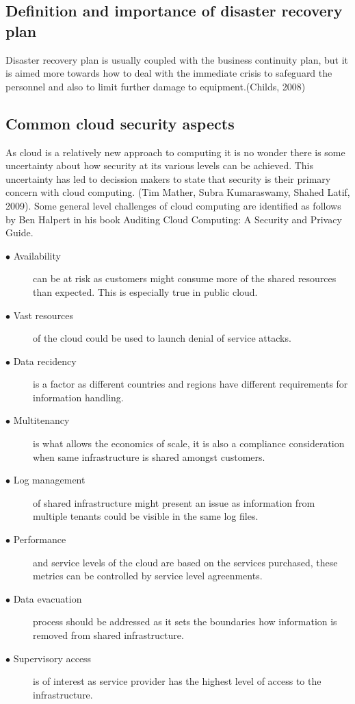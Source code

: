 \documentclass{article}
\begin{document}
\subsection{Definition and importance of disaster recovery plan}
Disaster recovery plan is usually coupled with the business continuity plan, but it is aimed more towards how to deal with the immediate crisis to safeguard the personnel and also to limit further damage to equipment.(Childs, 2008)
\subsection{Common cloud security aspects}
As cloud is a relatively new approach to computing it is no wonder there is some uncertainty about how security at its various levels can be achieved. This uncertainty has led to decission makers to state that security is their primary concern with cloud computing. (Tim Mather, Subra Kumaraswamy, Shahed Latif, 2009). 
Some general level challenges of cloud computing are identified as follows by Ben Halpert in his book Auditing Cloud Computing: A Security and Privacy Guide.
\begin{description}
	\item[$\bullet$ Availability] can be at risk as customers might consume more of the shared resources than expected. This is especially true in public cloud.
	\item[$\bullet$ Vast resources] of the cloud could be used to launch denial of service attacks.
	\item[$\bullet$ Data recidency] is a factor as different countries and regions have different requirements for information handling.
	\item[$\bullet$ Multitenancy] is what allows the economics of scale, it is also a compliance consideration when same infrastructure is shared amongst customers.
	\item[$\bullet$ Log management] of shared infrastructure might present an issue as information from multiple tenants could be visible in the same log files. 
	\item[$\bullet$ Performance] and service levels of the cloud are based on the services purchased, these metrics can be controlled by service level agreenments.
	\item[$\bullet$ Data evacuation] process should be addressed as it sets the boundaries how information is removed from shared infrastructure.
	\item[$\bullet$ Supervisory access] is of interest as service provider has the highest level of access to the infrastructure.
\end{description}
\end{document}
